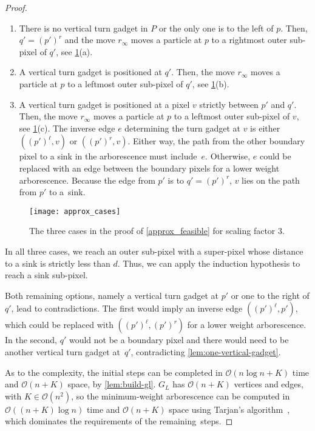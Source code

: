 \documentclass[a4paper,UKenglish,cleveref,thm-restate]{lipics-v2021}
\newcommand{\BigO}{\mathcal{O}}
\begin{document}
\begin{proof}
\begin{enumerate}
\item There is no vertical turn gadget in $P$ or the only one is to the left of
$p$. Then, $q'=(p')^r$ and the move $r_\infty$ moves a particle at $p$ to a
rightmost outer sub-pixel of $q'$, see \cref{fig:approx_cases}(a).
\item A vertical turn gadget is positioned at $q'$. Then, the move $r_\infty$
moves a particle at $p$ to a leftmost outer sub-pixel of $q'$,
see \cref{fig:approx_cases}(b).
\item A vertical turn gadget is positioned at a pixel $v$ strictly between $p'$
and $q'$. Then, the move $r_\infty$ moves a particle at $p$ to a leftmost outer
sub-pixel of $v$, see \cref{fig:approx_cases}(c). The inverse edge $e$
determining the turn gadget at $v$ is either $((p')^\ell,v)$ or
$((p')^r,v)$. Either way, the path from the other boundary pixel to a sink in
the arborescence must include~$e$. Otherwise, $e$ could be replaced with an edge
between the boundary pixels for a lower weight arborescence. Because the edge from
$p'$ is to $q' = (p')^r$, $v$ lies on the path from $p'$ to a~sink.
\end{enumerate}
\begin{figure}[htb]
	\centering
	\texttt{[image: approx\_cases]}\caption{The three cases in the proof of \cref{approx_feasible} for scaling
		factor $3$.}\label{fig:approx_cases}
\end{figure}

In all three cases, we reach an outer sub-pixel with a super-pixel whose
distance to a sink is strictly less than $d$. Thus, we can apply the induction
hypothesis to reach a sink sub-pixel.

Both remaining options, namely a vertical turn gadget at $p'$ or one to the
right of $q'$, lead to contradictions. The first would imply an
inverse edge $((p')^\ell,p')$, which could be replaced with \(((p')^\ell,
(p')^r)\) for a lower weight arborescence. In the second, $q'$ would not be
a boundary pixel and there would need to be another vertical turn gadget
at~$q'$, contradicting \cref{lem:one-vertical-gadget}.

As to the complexity, the initial steps can be completed in $\BigO(n \log n + K)$
time and $\BigO(n+K)$ space, by \cref{lem:build-gl}. $G_L$ has $\BigO(n+K)$ vertices and
edges, with $K \in \BigO(n^2)$, so the minimum-weight arborescence can be computed
in $\BigO((n+K) \log n)$ time and $\BigO(n+K)$ space using Tarjan's algorithm~\cite{tarjan-branchings1977}, which dominates the requirements of the remaining~steps.
\end{proof}
\end{document}
